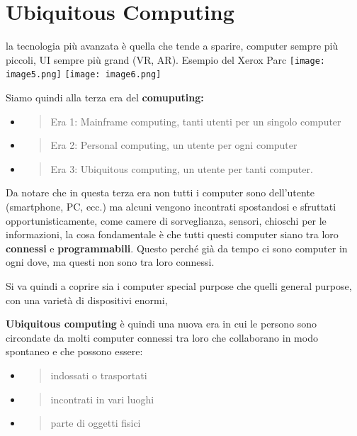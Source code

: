 \section{Ubiquitous Computing }\label{ubiquitous-computing}

la tecnologia più avanzata è quella che tende a sparire, computer sempre
più piccoli, UI sempre più grand (VR, AR). Esempio del Xerox
Parc
\texttt{[image: image5.png]}
\texttt{[image: image6.png]}

Siamo quindi alla terza era del \textbf{comuputing:}

\begin{itemize}
\item
  \begin{quote}
  Era 1: Mainframe computing, tanti utenti per un singolo computer
  \end{quote}
\item
  \begin{quote}
  Era 2: Personal computing, un utente per ogni computer
  \end{quote}
\item
  \begin{quote}
  Era 3: Ubiquitous computing, un utente per tanti computer.
  \end{quote}
\end{itemize}

Da notare che in questa terza era non tutti i computer sono dell'utente
(smartphone, PC, ecc.) ma alcuni vengono incontrati spostandosi e
sfruttati opportunisticamente, come camere di sorveglianza, sensori,
chioschi per le informazioni, la cosa fondamentale è che tutti questi
computer siano tra loro \textbf{connessi} e \textbf{programmabili}.
Questo perché già da tempo ci sono computer in ogni dove, ma questi non
sono tra loro connessi.

Si va quindi a coprire sia i computer special purpose che quelli general
purpose, con una varietà di dispositivi enormi,

\textbf{Ubiquitous computing} è quindi una nuova era in cui le persono
sono circondate da molti computer connessi tra loro che collaborano in
modo spontaneo e che possono essere:

\begin{itemize}
\item
  \begin{quote}
  indossati o trasportati
  \end{quote}
\item
  \begin{quote}
  incontrati in vari luoghi
  \end{quote}
\item
  \begin{quote}
  parte di oggetti fisici
  \end{quote}
\end{itemize}

